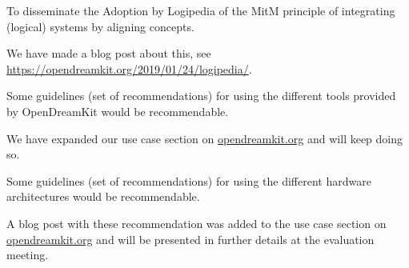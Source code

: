 \begin{recommendation}
  To disseminate the Adoption by Logipedia of the MitM principle of
  integrating (logical) systems by aligning concepts.
\end{recommendation}
We have made a blog post about this, see \url{https://opendreamkit.org/2019/01/24/logipedia/}.

\begin{recommendation}
  Some guidelines (set of recommendations) for using the different
  tools provided by OpenDreamKit would be recommendable.
\end{recommendation}
We have expanded our use case section on \url{opendreamkit.org} and
will keep doing so.


\begin{recommendation}
  Some guidelines (set of recommendations) for using the different
  hardware architectures would be recommendable.
\end{recommendation}
 A blog post with these recommendation was added to the use case section on \url{opendreamkit.org} and will be
 presented in further details at the evaluation meeting.


